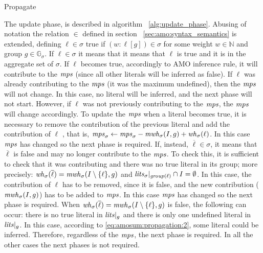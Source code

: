 \begin{algorithm}[H]\small
    \caption{Propagate}
    \label{alg:Propagate}
\end{algorithm}

The update phase, is described in algorithm ~\ref{alg:update_phase}.
Abusing of notation the relation $\in$ defined in section ~\ref{sec:amo:syntax_semantics}
is extended, defining $\ell \in \sigma$ true if $(w : \ell [g]) \in \sigma$ for some 
weight $w \in \mathbb{N}$ and group $g \in \mathbb{G}_{\sigma}$.  
If $\ell \in \sigma$ it means that it means that $\ell$ is true and it is in the 
aggregate set of $\sigma$. 
If $\ell$ becomes true, accordingly to AMO inference rule, it will contribute to the $\mathit{mps}$ (since all other literals
will be inferred as false). 
If $\ell$ was already contributing to the $\mathit{mps}$ (it was the maximum undefined), then the $\mathit{mps}$ will not change. 
In this case, no literal will be inferred, and the next phase will not start. 
However, if $\ell$ was not previously contributing to the $\mathit{mps}$, the $\mathit{mps}$ will change accordingly.
To update the $\mathit{mps}$ when a literal becomes true, it is necessary to remove the contribution of the previous literal and add the contribution of $\ell$
, that is,
$\mathit{mps}_\sigma \gets \mathit{mps}_\sigma -\mathit{mwh}_\sigma(I,g) + \mathit{wh}_\sigma(\ell)$.
In this case $\mathit{mps}$ has changed so the next phase is required.
If, instead, $\overline{\ell} \in \sigma$, it means that $\overline{\ell}$ is false and may no longer contribute 
to the $\mathit{mps}$.
To check this, it is sufficient to check that it 
was contributing and there was no true literal in its group;
more precisely: $\mathit{wh}_\sigma(\overline{\ell}) = \mathit{mwh}_\sigma(I \setminus \{\ell\},g)$
and $\mathit{lits}_\sigma|_{\mathit{group}(\ell)} \cap I = \emptyset$.
In this case, the contribution of $\ell$ has to be removed, since it is false,
and the new contribution ($\mathit{mwh}_\sigma(I,g)$) has to be added to $\mathit{mps}$.
In this case $\mathit{mps}$ has changed so the next phase is required.
When $\mathit{wh}_\sigma(\overline{\ell}) = \mathit{mwh}_\sigma(I \setminus \{\ell\}, g)$ is false,
the following can occur: there is no true literal in $\mathit{lits}|_g$ and there is only 
one undefined literal in $\mathit{lits}|_g$. In this case, according to \eqref{eq:amosum:propagation:2},
some literal could be inferred. Therefore, regardless of the $\mathit{mps}$, the next phase is required.
In all the other cases the next phases is not required.

